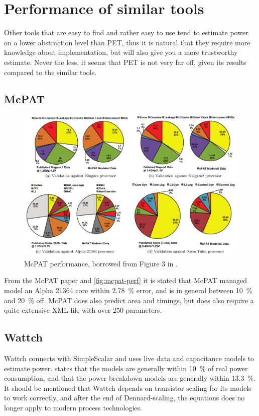 \section{Performance of similar tools}
Other tools that are easy to find and rather easy to use tend to estimate
power on a lower abstraction level than PET, thus it is natural that they
require more knowledge about implementation, but will also give you a more
trustworthy estimate. Never the less, it seems that PET is not very far off,
given its results compared to the similar tools.

\subsection{McPAT}

\begin{figure}[htb]
\includegraphics[width=\textwidth]{figs/mcpat-performance.png}
\caption{McPAT performance, borrowed from Figure 3 in \cite{li2009mcpat}.}
\label{fig:mcpat-perf}
\end{figure}

From the McPAT paper \cite{li2009mcpat} and \autoref{fig:mcpat-perf} it is
stated that McPAT managed model an Alpha 21364 core within 2.78~\% error, and is
in general between 10~\% and 20~\% off. McPAT does also predict area and timings,
but does also require a quite extensive XML-file with over 250 parameters.

\subsection{Wattch}

Wattch connects with SimpleScalar and uses live data and capacitance models to
estimate power. \cite{brooks2000wattch} states that the models are generally
within 10~\% of real power consumption, and that the power breakdown models are
generally within 13.3~\%. It should be mentioned that Wattch depends on
transistor scaling for its models to work correctly, and after the end of
Dennard-scaling, the equations does no longer apply to modern process
technologies.


